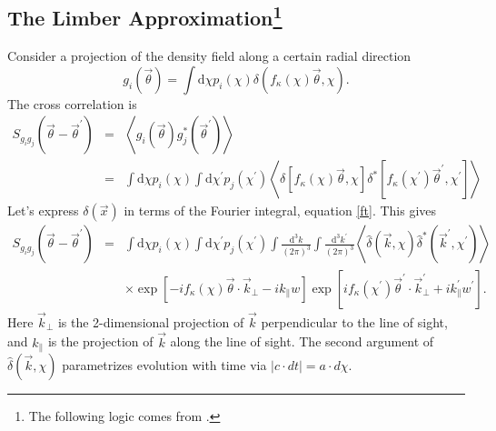 \documentclass[12pt,preprint]{aastex}			%
\newcommand{\rcom}{\chi}
\newcommand{\dd}{\mathrm{d}}
\begin{document}
\subsection{The Limber Approximation\footnote{The following logic comes from \citet{Bartelmann01}.}}
Consider a projection of the density field along a certain radial direction
\begin{equation}
  g_i(\vec{\theta}) = \int \dd\rcom p_i(\rcom)\delta\left(f_\kappa(\rcom)\vec{\theta},\rcom\right).
\end{equation}
The cross correlation is
\begin{eqnarray}
  \label{Sgg}
  S_{g_ig_j}(\vec\theta-\vec\theta^\prime) 
  &=& \left\langle g_i(\vec\theta)g^*_j(\vec\theta^\prime)\right\rangle \nonumber\\
  &=& \int \dd\rcom p_i(\rcom)
  \int \dd\rcom^\prime p_j(\rcom^\prime)
  \left\langle\delta[f_\kappa(\rcom)\vec{\theta},\rcom]
  \delta^*[f_\kappa(\rcom^\prime)\vec{\theta}^\prime,\rcom^\prime]
  \right\rangle
\end{eqnarray}
Let's express $\delta(\vec x)$ in terms of the Fourier integral, equation \ref{ft}.  This gives
\begin{eqnarray}
  S_{g_ig_j}(\vec\theta-\vec\theta^\prime) 
  &=& \int \dd\rcom p_i(\rcom)
  \int \dd\rcom^\prime p_j(\rcom^\prime)
  \int \frac{\dd^3k}{(2\pi)^3}\int \frac{\dd^3k^\prime}{(2\pi)^3}
  \left\langle\hat\delta(\vec k,\rcom)
  \hat\delta^*(\vec k^\prime, \rcom^\prime)
  \right\rangle\nonumber\\
  &&\times
  \exp\left[-i f_\kappa(\rcom)\vec{\theta}\cdot \vec k_\perp -i k_\parallel w\right]
  \exp\left[i f_\kappa(\rcom^\prime)\vec{\theta}^\prime \cdot \vec k^\prime_\perp  + i k^\prime_\parallel w^\prime\right].
\end{eqnarray}
Here $\vec k_\perp$ is the 2-dimensional projection of $\vec k$ perpendicular to 
the line of sight, and $k_\parallel$ is the projection of $\vec k$ along 
the line of sight.
The second argument of $\hat\delta(\vec k,\rcom)$ parametrizes evolution with
time via $|c\cdot dt| = a\cdot d\rcom$.
\end{document}
